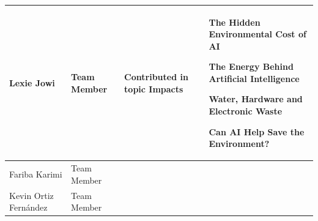 \documentclass[11pt]{article}
\begin{document}
\begin{longtable} [c] {|p{3cm}|l|p{7cm}|p{4cm}|}
	Lexie Jowi & Team Member &
	\par \textbullet{} Contributed in topic Impacts &
	\par \textbullet{} The Hidden Environmental Cost of AI
	\par \textbullet{} The Energy Behind Artificial Intelligence
	\par \textbullet{} Water, Hardware and Electronic Waste
	\par \textbullet{} Can AI Help Save the Environment? \\ 
	\hline
	
	Fariba Karimi & Team Member & &\\ 
	\hline
	
	Kevin Ortiz Fernández & Team Member & &\\ 
	\hline
\end{longtable}
\end{document}
